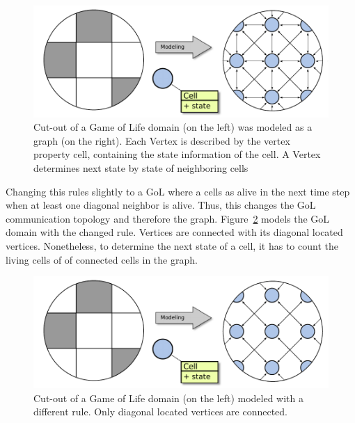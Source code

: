\begin{figure}[H]
  \centering \includegraphics[width=\textwidth]{graphics/30_gol_modeling}
  \caption{Cut-out of a Game of Life domain (on the left) was modeled
    as a graph (on the right). Each Vertex is described by the vertex
    property cell, containing the state information of the cell. A
    Vertex determines next state by state of neighboring cells}
  \label{fig:gol_modeling}
\end{figure}

Changing this rules slightly to a GoL where a cells as alive in the
next time step when at least one diagonal neighbor is alive.  Thus,
this changes the GoL communication topology and therefore the
graph. Figure~\ref{fig:gol_modeling_changed} models the GoL domain
with the changed rule. Vertices are connected with its diagonal
located vertices. Nonetheless, to determine the next state of a cell,
it has to count the living cells of of connected cells in the graph.

\begin{figure}[H]
  \centering \includegraphics[width=\textwidth]{graphics/30_gol_modeling_changed}
  \caption{Cut-out of a Game of Life domain (on the left) modeled
    with a different rule. Only diagonal located vertices are connected.}
  \label{fig:gol_modeling_changed}
\end{figure}


